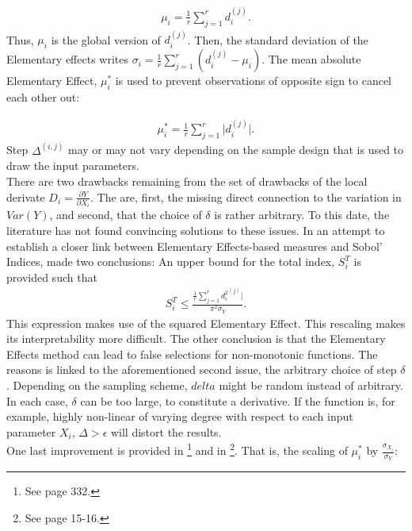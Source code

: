 \documentclass[a4paper,12pt]{article}
\begin{document}
\begin{align}
\mu_i = \frac{1}{r} \sum_{j=1}^{r} d_i^{(j)}.
\end{align}
\noindent
Thus, $\mu_i$ is the global version of $d_i^{(j)}$. Then, the standard deviation of the Elementary effects writes $\sigma_i = \frac{1}{r} \sum_{j=1}^{r} (d_i^{(j)} - \mu_i)$. The mean absolute Elementary Effect, $\mu_i^*$ is used to prevent observations of opposite sign to cancel each other out:

\begin{align}
\mu_i^* = \frac{1}{r} \sum_{j=1}^{r} \big| d_i^{(j)} \big|.
\end{align}
\noindent
Step $\Delta^{(i,j)}$ may or may not vary depending on the sample design that is used to draw the input parameters.\\

\noindent
There are two drawbacks remaining from the set of drawbacks of the local derivate $D_i = \frac{\partial Y}{\partial X_i}$. The are, first, the missing direct connection to the variation in $Var(Y)$, and second, that the choice of $\delta$ is rather arbitrary. To this date, the literature has not found convincing solutions to these issues. In an attempt to establish a closer link between Elementary Effects-based measures and Sobol' Indices, \cite{kucherenko2009derivative} made two conclusions: An upper bound for the total index, $S_i^T$ is provided such that
\begin{align}
S_i^T \leq \frac{\frac{1}{r} \sum_{j=1}^{r} {d_i^2}^{(j)}|}{\pi^2 \sigma_Y}.
\end{align}
This expression makes use of the squared Elementary Effect. This rescaling makes its interpretability more difficult. The other conclusion is that the Elementary Effects method can lead to false selections for non-monotonic functions. The reasons is linked to the aforementioned second issue, the arbitrary choice of step $\delta$. Depending on the sampling scheme, $delta$ might be random instead of arbitrary. In each case, $\delta$ can be too large, to constitute a derivative. If the function is, for example, highly non-linear of varying degree with respect to each input parameter $X_i$, $\Delta > \epsilon$ will distort the results.\\

\noindent
One last improvement is provided in \cite{Smith.2014}\footnote{See page 332.} and in \cite{Saltelli.2004}\footnote{See page 15-16.}. That is, the scaling of $\mu_{i}^*$ by $\frac{\sigma_{X_i}}{\sigma_Y}$:
\end{document}
